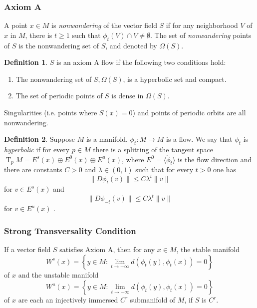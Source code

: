 \documentclass{article}
\theoremstyle{definition}
\newtheorem{definition}{Definition}
\theoremstyle{remark}
\newcommand{\T}{\operatorname{T}}
\newcommand{\TpM}{\T_p\!M}
\newcounter{ct}
\begin{document}
\subsubsection{Axiom A}
A point $x\in M$ is \emph{nonwandering} of the vector field $S$ if for any neighborhood $V$ of $x$ in $M$, there is $t\geq 1$ such that $\phi_t(V) \cap V\neq \emptyset$. The set of \emph{nonwandering} points of $S$ is the nonwandering set of $S$, and denoted by $\Omega(S)$. 

\begin{definition}
$S$ is an axiom A flow if the following two conditions hold:
\begin{enumerate}
\item The nonwandering set of $S, \Omega(S)$, is a hyperbolic set and compact.
\item The set of periodic points of $S$ is dense in $\Omega(S)$.
\end{enumerate}
\end{definition}

Singularities (i.e. points where $S(x)=0$) and points of periodic orbits are all nonwandering.

\begin{definition}
 Suppose $M$ is a manifold, $\phi_t\colon M\rightarrow M$ is a flow.
  We say that $\phi_t$ is \emph{hyperbolic} %
   if for every $p\in M$ there is a splitting of the tangent space $\TpM=E^s(x)\oplus E^0(x)\oplus E^u(x)$, where $E^0=\langle \dot\phi_t\rangle$ is the flow direction and there are constants $C>0$ and $\lambda\in(0,1)$ such that for every $t>0$ one has \[\|D\phi_t(v)\|\leq C\lambda^t\|v\|\]
for $v\in E^s(x)$ and \[\|D\phi_{-t}(v)\|\leq C\lambda^t\|v\|\] for $v\in E^u(x)$ . 
\end{definition}

\subsubsection{Strong Transversality Condition}

If a vector field $S$ satisfies Axiom A, then for any $x \in M$, the stable manifold 
\[W^s(x)=\left\{ y \in M \colon \lim_{t\rightarrow+\infty} d(\phi_t( y), \phi_t(x))=0\right\}\]
of $x$ and the unstable manifold
\[W^u(x)=\left\{ y \in M \colon \lim_{t\rightarrow-\infty} d(\phi_t( y), \phi_t(x))=0\right\}\]
of $x$ are each an injectively immersed $C^r$ submanifold of $M$, if $S$ is $C^r$.
\end{document}
